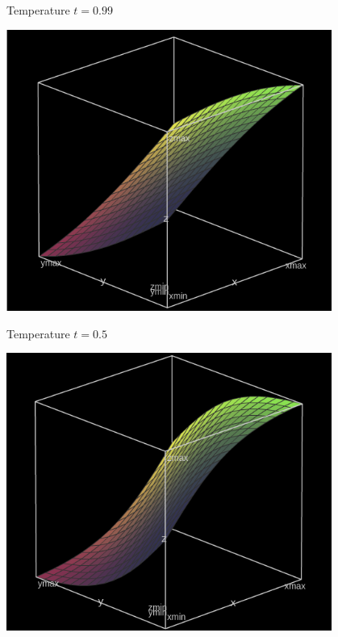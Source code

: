 \documentclass{beamer}
\begin{document}
\begin{frame}{Temperature $t=0.99$}
  \begin{center}
    \includegraphics[width=0.8\textwidth]{sm99}
  \end{center}
\end{frame}
\begin{frame}{Temperature $t=0.5$}
  \begin{center}
    \includegraphics[width=0.8\textwidth]{sm5}
  \end{center}
\end{frame}
\end{document}
